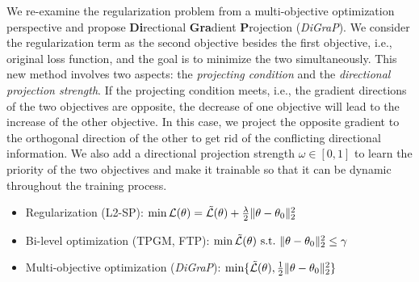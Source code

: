 We re-examine the regularization problem from a multi-objective optimization perspective and propose \textbf{Di}rectional \textbf{Gra}dient \textbf{P}rojection (\emph{DiGraP}). We consider the regularization term as the second objective besides the first objective, i.e., original loss function, and the goal is to minimize the two simultaneously. This new method involves two aspects: the \textit{projecting condition} and the \textit{directional projection strength}. If the projecting condition meets, i.e., the gradient directions of the two objectives are opposite, the decrease of one objective will lead to the increase of the other objective. In this case, we project the opposite gradient to the orthogonal direction of the other to get rid of the conflicting directional information. We also add a directional projection strength $\omega \in [0,1]$ to learn the priority of the two objectives and make it trainable so that it can be dynamic throughout the training process. 

\begin{itemize}
    \item Regularization (L2-SP): $\min \mathcal{L(\theta)} = \Tilde{\mathcal{L}}(\theta) + \frac{\lambda}{2}\|\theta-\theta_0\|^2_2$
    \item Bi-level optimization (TPGM, FTP): $\min \Tilde{\mathcal{L}}(\theta)~\text{s.t.}~\|\theta-\theta_0\|^2_2 \leq \gamma$
    \item Multi-objective optimization (\emph{DiGraP}): $\min \{\Tilde{\mathcal{L}}(\theta), \frac{1}{2}\|\theta-\theta_0\|^2_2\}$
\end{itemize}

